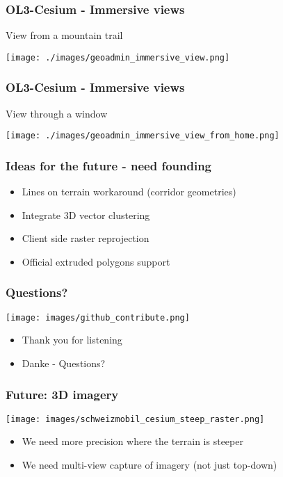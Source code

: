 \documentclass[presentation]{beamer}
\begin{document}
  \begin{frame}
    \frametitle{OL3-Cesium - Immersive views}
    View from a mountain trail
    \begin{center}
      \texttt{[image: ./images/geoadmin\_immersive\_view.png]}
    \end{center}
  \end{frame}


  \begin{frame}
    \frametitle{OL3-Cesium - Immersive views}
    View through a window
    \begin{center}
      \texttt{[image: ./images/geoadmin\_immersive\_view\_from\_home.png]}
    \end{center}
  \end{frame}


  \begin{frame}
    \frametitle{Ideas for the future - need founding}
    \begin{itemize}
      \pause\item Lines on terrain workaround (corridor geometries)
      \pause\item Integrate 3D vector clustering
      \pause\item Client side raster reprojection
      \pause\item Official extruded polygons support
    \end{itemize}
  \end{frame}


  \begin{frame}
    \frametitle{Questions?}
    \vspace{-20pt}\begin{center}
      \texttt{[image: images/github\_contribute.png]}
    \end{center}
    \begin{itemize}
      \item Thank you for listening
      \item Danke - Questions?
    \end{itemize}
  \end{frame}


  \begin{frame}
    \frametitle{Future: 3D imagery}
    \begin{center}
      \texttt{[image: images/schweizmobil\_cesium\_steep\_raster.png]}
    \end{center}
    \begin{itemize}
      \pause\item We need more precision where the terrain is steeper
      \pause\item We need multi-view capture of imagery (not just top-down)
    \end{itemize}
  \end{frame}
\end{document}
